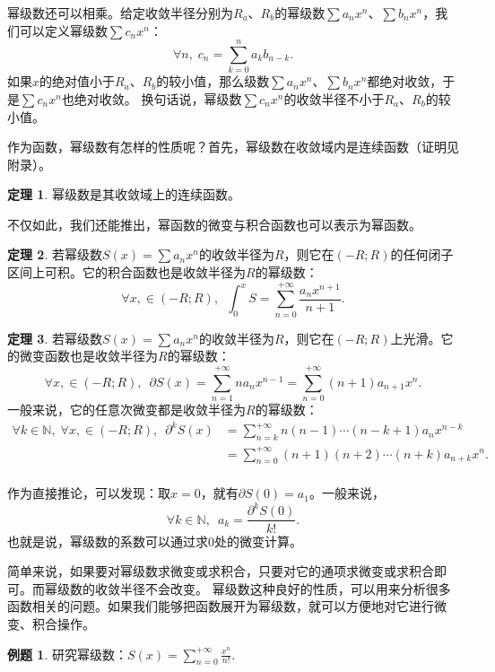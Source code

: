 \documentclass[12pt,UTF8]{ctexbook}
\theoremstyle{definition}
\newtheorem{tm}{定理}[section]
\newtheorem{et}{例题}[section]
\theoremstyle{plain}
\begin{document}
幂级数还可以相乘。给定收敛半径分别为$R_a$、$R_b$的幂级数$\sum a_n x^n$、$\sum b_n x^n$，我们可以定义幂级数$\sum c_n x^n$：
$$ \forall n, \; c_n = \sum_{k=0}^n a_k b_{n-k}.$$
如果$x$的绝对值小于$R_a$、$R_b$的较小值，那么级数$\sum a_n x^n$、$\sum b_n x^n$都绝对收敛，于是$\sum c_n x^n$也绝对收敛。
换句话说，幂级数$\sum c_n x^n$的收敛半径不小于$R_a$、$R_b$的较小值。

作为函数，幂级数有怎样的性质呢？首先，幂级数在收敛域内是连续函数（证明见附录）。

\begin{tm}
    幂级数是其收敛域上的连续函数。
\end{tm}

不仅如此，我们还能推出，幂函数的微变与积合函数也可以表示为幂函数。

\begin{tm}
    若幂级数$S(x) = \sum a_n x^n$的收敛半径为$R$，则它在$(-R;R)$的任何闭子区间上可积。它的积合函数也是收敛半径为$R$的幂级数：
    $$ \forall x, \in (-R;R),\,\,\, \int_0^x S =  \sum_{n=0}^{+\infty} \frac{a_n x^{n+1}}{n + 1}. $$
\end{tm}

\begin{tm}
    若幂级数$S(x) = \sum a_n x^n$的收敛半径为$R$，则它在$(-R;R)$上光滑。它的微变函数也是收敛半径为$R$的幂级数：
    $$ \forall x, \in (-R;R),\,\,\, \partial S(x) =  \sum_{n=1}^{+\infty} na_n x^{n-1} = \sum_{n=0}^{+\infty} (n + 1)a_{n+1} x^{n}. $$
    一般来说，它的任意次微变都是收敛半径为$R$的幂级数：
    \begin{align*}
        \forall k \in \mathbb{N},\;\forall x, \in (-R;R),\,\,\, \partial^k S(x) &= \sum_{n=k}^{+\infty} n(n-1)\cdots(n - k + 1)a_n x^{n-k} \\
        &= \sum_{n=0}^{+\infty} (n + 1)(n + 2)\cdots(n + k)a_{n+k} x^{n}. \\
    \end{align*}
\end{tm}

作为直接推论，可以发现：取$x=0$，就有$\partial S(0) = a_1$。一般来说，
$$\forall k\in \mathbb{N}, \,\,\, a_k = \frac{\partial^k S(0)}{k!}.$$
也就是说，幂级数的系数可以通过求$0$处的微变计算。

简单来说，如果要对幂级数求微变或求积合，只要对它的通项求微变或求积合即可。而幂级数的收敛半径不会改变。
幂级数这种良好的性质，可以用来分析很多函数相关的问题。如果我们能够把函数展开为幂级数，就可以方便地对它进行微变、积合操作。

\begin{et}
    研究幂级数：$S(x) = \sum_{n=0}^{+\infty} \frac{x^n}{n!}. $
\end{et}
\end{document}
